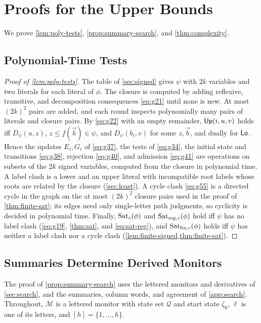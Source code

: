 \section{Proofs for the Upper Bounds}
\label{app:complexity}

We prove \cref{lem:poly-tests}, \cref{prop:summary-search}, and
\cref{thm:complexity}.

\subsection{Polynomial-Time Tests}

\begin{proof}[Proof of \cref{lem:poly-tests}]
The table of \cref{sec:signed} gives $\psi$ with $2k$ variables and two
literals for each literal of $\phi$. The
closure is computed by adding reflexive, transitive, and decomposition
consequences \eqref{eq:g21} until none is new. At most $(2k)^2$ pairs are
added, and each round inspects polynomially many pairs of literals and
closure pairs. By \eqref{eq:g22} with an empty remainder, $\mathsf{Up}(i,u,v)$ holds
iff $D_\psi(u,z)$, $z\le f(\vec b)\in\psi$, and $D_\psi(b_i,v)$ for some
$z,\vec b$, and dually for $\mathsf{Lo}$. Hence the updates $E_i,G_i$ of
\eqref{eq:g37}, the tests of \eqref{eq:g34}, the initial state and transitions
\eqref{eq:g38}, rejection \eqref{eq:g40}, and admission \eqref{eq:g41} are
operations on subsets of the $2k$ signed variables, computed from the
closure in polynomial time. A label clash is a lower and an upper literal
with incompatible root labels whose roots are related by the closure
(\cref{sec:least}). A cycle clash \eqref{eq:g55} is a directed cycle in the
graph on the at most $(2k)^2$ closure pairs used in the proof of
\cref{thm:finite-sat}; its edges need only single-letter path judgments, so
cyclicity is decided in polynomial time. Finally, $\operatorname{Sat}_c(\phi)$ and
$\operatorname{Sat}_{\mathrm{reg},c}(\phi)$ hold iff $\psi$ has no label clash
(\eqref{eq:g19}, \cref{thm:sat}, and \eqref{eq:sat-reg}), and
$\operatorname{Sat}_{\mathrm{fin},c}(\phi)$ holds iff $\psi$ has neither a label clash nor a
cycle clash (\cref{lem:finite-signed,thm:finite-sat}).
\end{proof}

\subsection{Summaries Determine Derived Monitors}

The proof of \cref{prop:summary-search} uses the lettered monitors and
derivatives of \cref{sec:search}, and the summaries, column words, and
agreement of \cref{app:search}. Throughout, $\mathcal M$ is a lettered monitor
with state set $\mathcal Q$ and start state $\zeta_0$, $\ell$ is one of its
letters, and $[h]=\{1,\ldots,h\}$.

